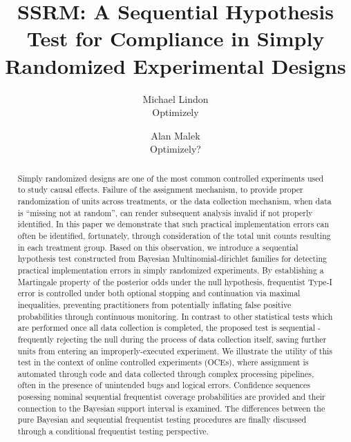 \documentclass[11pt]{article}
\begin{document}
\vspace{-1in}
\title{SSRM: A Sequential Hypothesis Test for Compliance in Simply Randomized Experimental Designs}
\author{\Large Michael Lindon \\ Optimizely \and Alan Malek \\ Optimizely?}
\maketitle 
\begin{abstract}
  Simply randomized designs are one of the most common controlled experiments used to study causal effects.
  Failure of the assignment mechanism, to provide proper randomization of units across treatments, or the data collection mechanism, when data is ``missing not at random'', can render subsequent analysis invalid if not properly identified. In this paper we demonstrate that such practical implementation errors can often be identified, fortunately, through consideration of the total unit counts resulting in each treatment group.
  Based on this observation, we introduce a sequential hypothesis test constructed from Bayesian Multinomial-dirichlet families for detecting practical implementation errors in simply randomized experiments. By establishing a Martingale property of the posterior odds under the null hypothesis, frequentist Type-I error is controlled under both optional stopping and continuation via maximal inequalities, preventing practitioners from potentially inflating false positive probabilities through continuous monitoring.
  In contrast to other statistical tests which are performed once all data collection is completed, the proposed test is sequential - frequently rejecting the null during the process of data collection itself, saving further units from entering an improperly-executed experiment.
  We illustrate the utility of this test in the context of online controlled experiments (OCEs), where assignment is automated through code and data collected through complex processing pipelines, often in the presence of unintended bugs and logical errors. Confidence sequences posessing nominal sequential frequentist coverage probabilities are provided and their connection to the Bayesian support interval is examined. The differences between the pure Bayesian and sequential frequentist testing procedures are finally discussed through a conditional frequentist testing perspective.  
\end{abstract}
\end{document}
